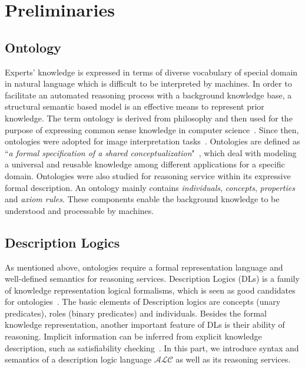\documentclass{article}
\begin{document}
\section{Preliminaries}\label{sec:pre}
\subsection{Ontology}
Experts' knowledge is expressed in terms of diverse vocabulary of special domain in natural language which is difficult to be interpreted by machines.
In order to facilitate an automated reasoning process with a background knowledge base, a structural semantic based model is  an effective means to represent prior knowledge.
The term ontology is derived from philosophy and then used for the purpose of expressing common sense knowledge in computer science~\cite{alexander1986knowledge}.
Since then, ontologies were adopted for image interpretation tasks~\cite{bannour2011towards,Hudelot2008fuzzy,town2006ontological}.
Ontologies are defined as “\textit{a formal specification of a shared conceptualization}"~\cite{studer1998knowledge},
which deal with modeling a universal and reusable knowledge among different applications for a specific domain.
Ontologies were also studied for reasoning service within its expressive formal description. 
An ontology mainly contains  \textit{individuals}, \textit{concepts}, \textit{properties} and \textit{axiom rules}. 
These components enable the background knowledge to be understood and processable by machines.

\subsection{Description Logics}
As mentioned above, ontologies require a formal representation language and well-defined semantics for reasoning services. 
Description Logics (DLs) is a family of knowledge representation logical formalisms, which is seen as good candidates for ontologies~\cite{horrocks1999description}.
The basic elements of Description logics are concepts (unary predicates), roles (binary predicates) and individuals.
Besides the formal knowledge representation, another important feature of DLs is their ability of reasoning.
Implicit information can be inferred from explicit knowledge description, such as satisfiability checking~\cite{baader2003description}. 
In this part, we introduce syntax and semantics of a description logic language $\mathcal{ALC}$ as well as its reasoning services.
\end{document}
